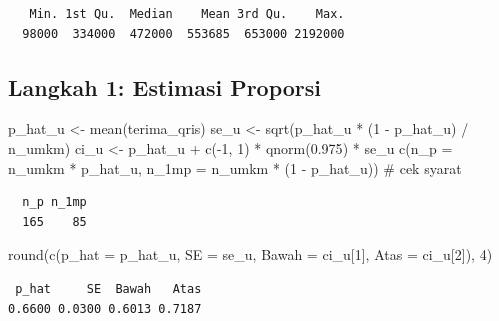 \documentclass[
  indonesian,
  letterpaper,
]{book}
\newenvironment{Shaded}{\begin{snugshade}}{\end{snugshade}}
\newcommand{\AttributeTok}[1]{\textcolor[rgb]{0.40,0.45,0.13}{#1}}
\newcommand{\CommentTok}[1]{\textcolor[rgb]{0.37,0.37,0.37}{#1}}
\newcommand{\DecValTok}[1]{\textcolor[rgb]{0.68,0.00,0.00}{#1}}
\newcommand{\FloatTok}[1]{\textcolor[rgb]{0.68,0.00,0.00}{#1}}
\newcommand{\FunctionTok}[1]{\textcolor[rgb]{0.28,0.35,0.67}{#1}}
\newcommand{\NormalTok}[1]{\textcolor[rgb]{0.00,0.23,0.31}{#1}}
\newcommand{\OtherTok}[1]{\textcolor[rgb]{0.00,0.23,0.31}{#1}}
\newcommand{\SpecialCharTok}[1]{\textcolor[rgb]{0.37,0.37,0.37}{#1}}
\begin{document}
\begin{verbatim}
   Min. 1st Qu.  Median    Mean 3rd Qu.    Max. 
  98000  334000  472000  553685  653000 2192000 
\end{verbatim}

\subsection{Langkah 1: Estimasi
Proporsi}\label{langkah-1-estimasi-proporsi}

\begin{Shaded}
\begin{Highlighting}[]
\NormalTok{p\_hat\_u }\OtherTok{\textless{}{-}} \FunctionTok{mean}\NormalTok{(terima\_qris)}
\NormalTok{se\_u }\OtherTok{\textless{}{-}} \FunctionTok{sqrt}\NormalTok{(p\_hat\_u }\SpecialCharTok{*}\NormalTok{ (}\DecValTok{1} \SpecialCharTok{{-}}\NormalTok{ p\_hat\_u) }\SpecialCharTok{/}\NormalTok{ n\_umkm)}
\NormalTok{ci\_u }\OtherTok{\textless{}{-}}\NormalTok{ p\_hat\_u }\SpecialCharTok{+} \FunctionTok{c}\NormalTok{(}\SpecialCharTok{{-}}\DecValTok{1}\NormalTok{, }\DecValTok{1}\NormalTok{) }\SpecialCharTok{*} \FunctionTok{qnorm}\NormalTok{(}\FloatTok{0.975}\NormalTok{) }\SpecialCharTok{*}\NormalTok{ se\_u}
\FunctionTok{c}\NormalTok{(}\AttributeTok{n\_p =}\NormalTok{ n\_umkm }\SpecialCharTok{*}\NormalTok{ p\_hat\_u, }\AttributeTok{n\_1mp =}\NormalTok{ n\_umkm }\SpecialCharTok{*}\NormalTok{ (}\DecValTok{1} \SpecialCharTok{{-}}\NormalTok{ p\_hat\_u)) }\CommentTok{\# cek syarat}
\end{Highlighting}
\end{Shaded}

\begin{verbatim}
  n_p n_1mp 
  165    85 
\end{verbatim}

\begin{Shaded}
\begin{Highlighting}[]
\FunctionTok{round}\NormalTok{(}\FunctionTok{c}\NormalTok{(}\AttributeTok{p\_hat =}\NormalTok{ p\_hat\_u, }\AttributeTok{SE =}\NormalTok{ se\_u, }\AttributeTok{Bawah =}\NormalTok{ ci\_u[}\DecValTok{1}\NormalTok{], }\AttributeTok{Atas =}\NormalTok{ ci\_u[}\DecValTok{2}\NormalTok{]), }\DecValTok{4}\NormalTok{)}
\end{Highlighting}
\end{Shaded}

\begin{verbatim}
 p_hat     SE  Bawah   Atas 
0.6600 0.0300 0.6013 0.7187 
\end{verbatim}
\end{document}
